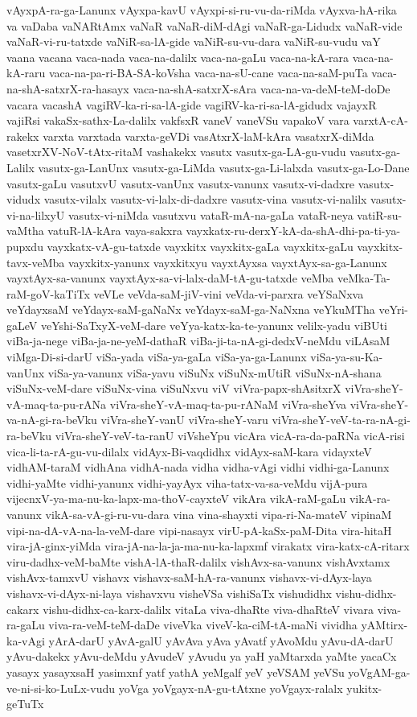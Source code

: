 {vAyxpA-ra-ga-Lanunx
vAyxpa-kavU
vAyxpi-si-ru-vu-da-riMda
vAyxva-hA-rika
va
vaDaba
vaNARtAmx
vaNaR
vaNaR-diM-dAgi
vaNaR-ga-Lidudx
vaNaR-vide
vaNaR-vi-ru-tatxde
vaNiR-sa-lA-gide
vaNiR-su-vu-dara
vaNiR-su-vudu
vaY
vaana
vacana
vaca-nada
vaca-na-dalilx
vaca-na-gaLu
vaca-na-kA-rara
vaca-na-kA-raru
vaca-na-pa-ri-BA-SA-koVsha
vaca-na-sU-cane
vaca-na-saM-puTa
vaca-na-shA-satxrX-ra-hasayx
vaca-na-shA-satxrX-sAra
vaca-na-va-deM-teM-doDe
vacara
vacashA
vagiRV-ka-ri-sa-lA-gide
vagiRV-ka-ri-sa-lA-gidudx
vajayxR
vajiRsi
vakaSx-sathx-La-dalilx
vakfsxR
vaneV
vaneVSu
vapakoV
vara
varxtA-cA-rakekx
varxta
varxtada
varxta-geVDi
vasAtxrX-laM-kAra
vasatxrX-diMda
vasetxrXV-NoV-tAtx-ritaM
vashakekx
vasutx
vasutx-ga-LA-gu-vudu
vasutx-ga-Lalilx
vasutx-ga-LanUnx
vasutx-ga-LiMda
vasutx-ga-Li-lalxda
vasutx-ga-Lo-Dane
vasutx-gaLu
vasutxvU
vasutx-vanUnx
vasutx-vanunx
vasutx-vi-dadxre
vasutx-vidudx
vasutx-vilalx
vasutx-vi-lalx-di-dadxre
vasutx-vina
vasutx-vi-nalilx
vasutx-vi-na-lilxyU
vasutx-vi-niMda
vasutxvu
vataR-mA-na-gaLa
vataR-neya
vatiR-su-vaMtha
vatuR-lA-kAra
vaya-sakxra
vayxkatx-ru-derxY-kA-da-shA-dhi-pa-ti-ya-pupxdu
vayxkatx-vA-gu-tatxde
vayxkitx
vayxkitx-gaLa
vayxkitx-gaLu
vayxkitx-tavx-veMba
vayxkitx-yanunx
vayxkitxyu
vayxtAyxsa
vayxtAyx-sa-ga-Lanunx
vayxtAyx-sa-vanunx
vayxtAyx-sa-vi-lalx-daM-tA-gu-tatxde
veMba
veMka-Ta-raM-goV-kaTiTx
veVLe
veVda-saM-jiV-vini
veVda-vi-parxra
veYSaNxva
veYdayxsaM
veYdayx-saM-gaNaNx
veYdayx-saM-ga-NaNxna
veYkuMTha
veYri-gaLeV
veYshi-SaTxyX-veM-dare
veYya-katx-ka-te-yanunx
velilx-yadu
viBUti
viBa-ja-nege
viBa-ja-ne-yeM-dathaR
viBa-ji-ta-nA-gi-dedxV-neMdu
viLAsaM
viMga-Di-si-darU
viSa-yada
viSa-ya-gaLa
viSa-ya-ga-Lanunx
viSa-ya-su-Ka-vanUnx
viSa-ya-vanunx
viSa-yavu
viSuNx
viSuNx-mUtiR
viSuNx-nA-shana
viSuNx-veM-dare
viSuNx-vina
viSuNxvu
viV
viVra-papx-shAsitxrX
viVra-sheY-vA-maq-ta-pu-rANa
viVra-sheY-vA-maq-ta-pu-rANaM
viVra-sheYva
viVra-sheY-va-nA-gi-ra-beVku
viVra-sheY-vanU
viVra-sheY-varu
viVra-sheY-veV-ta-ra-nA-gi-ra-beVku
viVra-sheY-veV-ta-ranU
viVsheYpu
vicAra
vicA-ra-da-paRNa
vicA-risi
vica-li-ta-rA-gu-vu-dilalx
vidAyx-Bi-vaqdidhx
vidAyx-saM-kara
vidayxteV
vidhAM-taraM
vidhAna
vidhA-nada
vidha
vidha-vAgi
vidhi
vidhi-ga-Lanunx
vidhi-yaMte
vidhi-yanunx
vidhi-yayAyx
viha-tatx-va-sa-veMdu
vijA-pura
vijecnxV-ya-ma-nu-ka-lapx-ma-thoV-cayxteV
vikAra
vikA-raM-gaLu
vikA-ra-vanunx
vikA-sa-vA-gi-ru-vu-dara
vina
vina-shayxti
vipa-ri-Na-mateV
vipinaM
vipi-na-dA-vA-na-la-veM-dare
vipi-nasayx
virU-pA-kaSx-paM-Dita
vira-hitaH
vira-jA-ginx-yiMda
vira-jA-na-la-ja-ma-nu-ka-lapxmf
virakatx
vira-katx-cA-ritarx
viru-dadhx-veM-baMte
vishA-lA-thaR-dalilx
vishAvx-sa-vanunx
vishAvxtamx
vishAvx-tamxvU
vishavx
vishavx-saM-hA-ra-vanunx
vishavx-vi-dAyx-laya
vishavx-vi-dAyx-ni-laya
vishavxvu
visheVSa
vishiSaTx
vishudidhx
vishu-didhx-cakarx
vishu-didhx-ca-karx-dalilx
vitaLa
viva-dhaRte
viva-dhaRteV
vivara
viva-ra-gaLu
viva-ra-veM-teM-daDe
viveVka
viveV-ka-ciM-tA-maNi
vividha
yAMtirx-ka-vAgi
yArA-darU
yAvA-galU
yAvAva
yAva
yAvatf
yAvoMdu
yAvu-dA-darU
yAvu-dakekx
yAvu-deMdu
yAvudeV
yAvudu
ya
yaH
yaMtarxda
yaMte
yacaCx
yasayx
yasayxsaH
yasimxnf
yatf
yathA
yeMgalf
yeV
yeVSAM
yeVSu
yoVgAM-ga-ve-ni-si-ko-LuLx-vudu
yoVga
yoVgayx-nA-gu-tAtxne
yoVgayx-ralalx
yukitx-geTuTx
}
